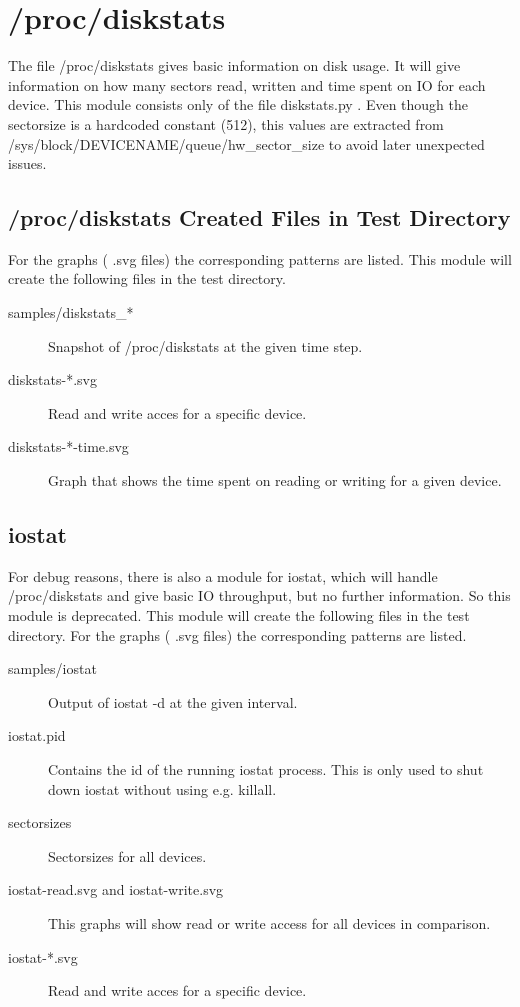 \section{/proc/diskstats}
    The file /proc/diskstats gives basic information on disk usage.
    It will give information on how many sectors read, written
    and time spent on IO for each device.
    This module consists only of the file diskstats.py .
    Even though the sectorsize is a hardcoded constant (512),
    this values are extracted from /sys/block/DEVICENAME/queue/hw\_sector\_size
    to avoid later unexpected issues.

\subsection{/proc/diskstats Created Files in Test Directory}
    For the graphs ( .svg files) the corresponding patterns are listed.
    This module will create the following files in the test directory.
    \begin{description}
        \item[samples/diskstats\_*]
            Snapshot of /proc/diskstats at the given time step.
        \item[diskstats-*.svg]
            Read and write acces for a specific device.
        \item[diskstats-*-time.svg]
            Graph that shows the time spent on reading or writing for a given device.
    \end{description}

\subsection{iostat}
    For debug reasons, there is also a module for iostat, which will handle
    /proc/diskstats and give basic IO throughput, but no further information.
    So this module is deprecated.
    This module will create the following files in the test directory.
    For the graphs ( .svg files) the corresponding patterns are listed.
    \begin{description}
        \item[samples/iostat]
            Output of iostat -d at the given interval.

        \item[iostat.pid]
            Contains the id of the running iostat process.
            This is only used to shut down iostat without using e.g. killall.

        \item[sectorsizes]
            Sectorsizes for all devices.

        \item[iostat-read.svg and iostat-write.svg]
            This graphs will show read or write access for all devices in comparison.

        \item[iostat-*.svg]
            Read and write acces for a specific device.
    \end{description}
